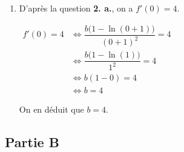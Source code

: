 \begin{enumerate}
\begin{enumerate}
			\item D'après la question \textbf{2. a.}, on a $f'(0) = 4$.

			$\begin{aligned}
				f'(0) = 4
					&\iff \dfrac{b\big(1-\ln (0+1)\big)}{(0+1)^{2}} = 4\\
					&\iff \dfrac{b\big(1 - \ln(1)\big)}{1^2} = 4\\
					&\iff b(1 - 0) = 4\\
					&\iff b = 4
			\end{aligned}$

			On en déduit que \quad $b = 4$.
		\end{enumerate}
	\end{enumerate}

	\subsection*{Partie B}

